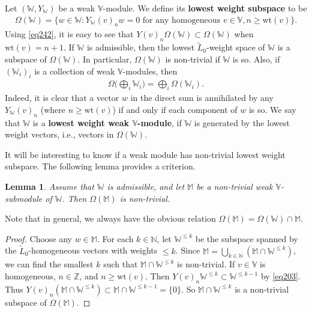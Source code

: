 \documentclass[12pt,b5paper,notitlepage]{report}
\theoremstyle{definition}
\theoremstyle{plain}
\newtheorem{lm}[df]{Lemma}
\newcommand{\wtd}{\widetilde}
\newcommand{\Vbb}{\mathbb V}
\newcommand{\Wbb}{\mathbb W}
\newcommand{\Mbb}{\mathbb M}
\newcommand{\Nbb}{\mathbb N}
\newcommand{\Zbb}{\mathbb Z}
\newcommand{\wt}{\mathrm{wt}}
\numberwithin{equation}{section}
\begin{document}
Let $(\Wbb,Y_\Wbb)$ be a weak $\Vbb$-module. We define its \textbf{lowest weight subspace} to be \index{zz@$\Omega(\Wbb),\Omega_{+-}(\Wbb)$}
\begin{align*}
\Omega(\Wbb)=\{w\in\Wbb:Y_\Wbb(v)_nw=0\text{ for any homogeneous }v\in\Vbb,n\geq \wt(v)\}.
\end{align*}
Using \eqref{eq242}, it is easy to see that $Y(v)_n\Omega(\Wbb)\subset\Omega(\Wbb)$ when $\wt(v)=n+1$.  If $\Wbb$ is admissible, then the lowest $\wtd L_0$-weight space of $\Wbb$ is a subspace of $\Omega(\Wbb)$. In particular, $\Omega(\Wbb)$ is non-trivial if $\Wbb$ is so. Also, if $(\Wbb_i)_i$ is a collection of weak $\Vbb$-modules, then
\begin{align}
\Omega\Big(\bigoplus_i \Wbb_i\Big)=\bigoplus_i\Omega(\Wbb_i).\label{eq205}
\end{align}
Indeed, it is clear that a vector $w$ in the direct sum is annihilated by any $Y_\Wbb(v)_n$ (where $n\geq\wt(v)$) if and only if each component of $w$ is so. We say that $\Wbb$ is a \textbf{lowest weight weak $\Vbb$-module}, if $\Wbb$ is generated by the lowest weight vectors, i.e., vectors in $\Omega(\Wbb)$.


It will be interesting to know if a weak module has non-trivial lowest weight subspace. The following lemma provides a criterion.

\begin{lm}\label{lb96}
Assume that $\Wbb$ is admissible, and let $\Mbb$ be a non-trivial weak $\Vbb$-submodule of $\Wbb$. Then $\Omega(\Mbb)$ is non-trivial.
\end{lm}

Note that in general, we always have the obvious relation $\Omega(\Mbb)=\Omega(\Wbb)\cap \Mbb$.


\begin{proof}
Choose any $w\in\Mbb$. For each $k\in\Nbb$, let $\Wbb^{\leq k}$ be the subspace spanned by the $\wtd L_0$-homogeneous vectors with weights $\leq k$. Since $\Mbb=\bigcup_{k\in\Nbb}(\Mbb\cap\Wbb^{\leq k})$, we can find the smallest $k$ such that $\Mbb\cap\Wbb^{\leq k}$ is non-trivial. If $v\in\Vbb$ is homogeneous, $n\in\Zbb$, and $n\geq\wt(v)$. Then $Y(v)_n\Wbb^{\leq k}\subset\Wbb^{\leq k-1}$ by \eqref{eq203}. Thus $Y(v)_n(\Mbb\cap\Wbb^{\leq k})\subset\Mbb\cap\Wbb^{\leq k-1}=\{0\}$. So $\Mbb\cap\Wbb^{\leq k}$ is a non-trivial subspace of $\Omega(\Mbb)$.
\end{proof}
\end{document}
